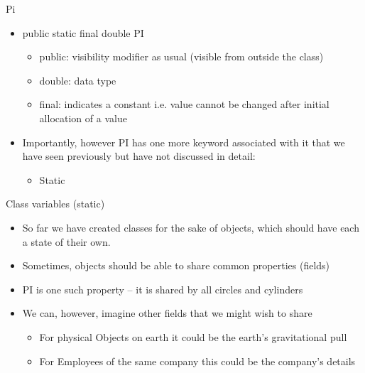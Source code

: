 \documentclass{beamer}
\begin{document}
\begin{frame}
\end{frame} \begin{frame}

Pi

\begin{itemize}
\item public static final double PI

\begin{itemize}
\item public: visibility modifier as usual (visible from outside the class)
\item double: data type 
\item final: indicates a constant i.e. value cannot be changed after initial allocation of a value
\end{itemize}
\item Importantly, however PI has one more keyword associated with it that we have seen previously but have not
discussed in detail:

\begin{itemize}
\item Static
\end{itemize}
\end{itemize}

\end{frame} \begin{frame}

Class variables (static)
\begin{itemize}
\item So far we have created classes for the sake of objects, which should have each a state of their own.
\item Sometimes, objects should be able to share common properties (fields)
\item PI is one such property -- it is shared by all circles and cylinders
\item We can, however, imagine other fields that we might wish to share

\begin{itemize}
\item For physical Objects on earth it could be the earth's gravitational pull
\item For Employees of the same company this could be the company's details
\end{itemize}
\end{itemize}

\end{frame} 
\end{document}
